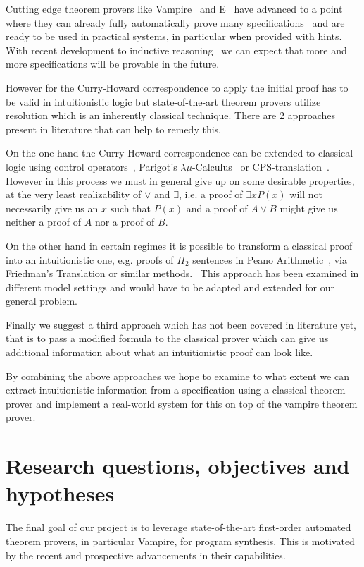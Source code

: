 \documentclass[a4paper,12pt]{article}
\begin{document}
	Cutting edge theorem provers like Vampire~\cite{Vampire1} and E~\cite{E1} have advanced to a point where they can already fully automatically prove many specifications~\cite{CASC} and are ready to be used in practical systems, in particular when provided with hints. With recent development to inductive reasoning~\cite{Vampire2}\cite{Vampire3} we can expect that more and more specifications will be provable in the future.
	
	However for the Curry-Howard correspondence to apply the initial proof has to be valid in intuitionistic logic but state-of-the-art theorem provers utilize resolution which is an inherently classical technique. There are 2 approaches  present in literature that can help to remedy this.
	
	On the one hand the Curry-Howard correspondence can be extended to classical logic using control operators~\cite{Control1}, Parigot's $\lambda\mu$-Calculus~\cite{Parigot1} or CPS-translation~\cite{CPS1}. However in this process we must in general give up on some desirable properties, at the very least realizability of $\vee$ and $\exists$, i.e. a proof of $\exists xP(x)$ will not necessarily give us an $x$ such that $P(x)$ and a proof of $A\vee B$ might give us neither a proof of $A$ nor a proof of $B$.
	
	On the other hand in certain regimes it is possible to transform a classical proof into an intuitionistic one, e.g. proofs of $\Pi_2$ sentences in Peano Arithmetic~\cite{HAPA}, via Friedman's Translation or similar methods.~\cite{Friedman} This approach has been examined in different model settings and would have to be adapted and extended for our general problem.
	
	Finally we suggest a third approach which has not been covered in literature yet, that is to pass a modified formula to the classical prover which can give us additional information about what an intuitionistic proof can look like.
	
	By combining the above approaches we hope to examine to what extent we can extract intuitionistic information from a specification using a classical theorem prover and implement a real-world system for this on top of the vampire theorem prover.
	
	\section{Research questions, objectives and hypotheses}
	
	The final goal of our project is to leverage state-of-the-art first-order automated theorem provers, in particular Vampire, for program synthesis. This is motivated by the recent and prospective advancements in their capabilities.
	
\end{document}
